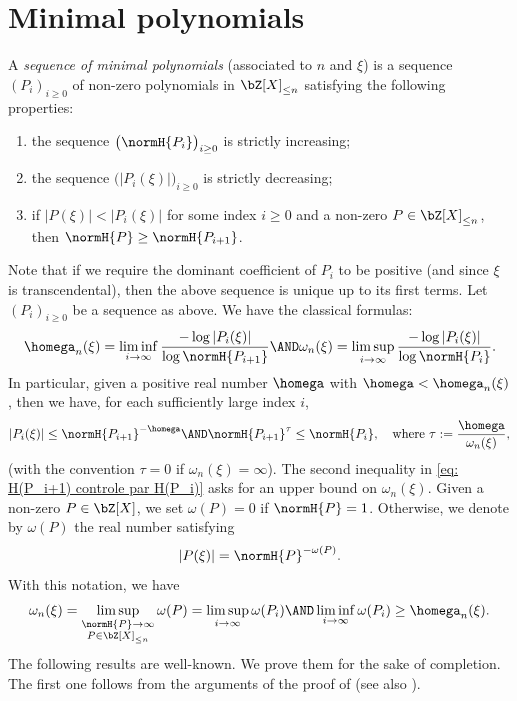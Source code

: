 \section{Minimal polynomials}
\label{section: minimal pol}

A \emph{sequence of minimal polynomials} (associated to $n$ and $\xi$) is a sequence $(P_i)_{i\geq 0}$ of non-zero polynomials in $\bZ[X]_{\leq n}$ satisfying the following properties:
\begin{enumerate}
\item the sequence $\big(\normH{P_i}\big)_{i\geq 0}$ is strictly increasing;
\item the sequence $\big(|P_i(\xi)|\big)_{i\geq 0}$ is strictly decreasing;
\item if $|P(\xi)| < |P_i(\xi)|$ for some index $i\geq 0$ and a non-zero $P\in\bZ[X]_{\leq n}$, then $\normH{P}\geq \normH{P_{i+1}}$.
\end{enumerate}

Note that if we require the dominant coefficient of $P_i$ to be positive (and since $\xi$ is transcendental), then the above sequence is unique up to its first terms. Let $(P_i)_{i\geq 0}$ be a sequence as above. We have the classical formulas:
\begin{equation}
\label{eq: exposant via minimal points}
\homega_n(\xi) = \liminf_{i\to \infty} \frac{-\log |P_i(\xi)|}{\log \normH{P_{i+1}}} \AND \omega_n(\xi) = \limsup_{i\to \infty} \frac{-\log |P_i(\xi)|}{\log \normH{P_{i}}}.
\end{equation}
In particular, given a positive real number $\homega$ with $\homega < \homega_n(\xi)$, then we have, for each sufficiently large index $i$,
\begin{equation}
\label{eq: H(P_i+1) controle par H(P_i)}
|P_i(\xi)| \leq \normH{P_{i+1}}^{-\homega} \AND \normH{P_{i+1}}^\tau \leq \normH{P_i},\quad \textrm{where } \tau:= \frac{\homega}{\omega_n(\xi)},
\end{equation}
(with the convention $\tau = 0$ if $\omega_n(\xi) = \infty$). The second inequality in \eqref{eq: H(P_i+1) controle par H(P_i)} asks for an upper bound on $\omega_n(\xi)$. Given a non-zero $P \in \bZ[X]$, we set $\omega(P)=0$ if $\normH{P} = 1$. Otherwise, we denote by $\omega(P)$ the real number satisfying
\[
|P(\xi)| = \normH{P}^{-\omega(P)}.
\]
With this notation, we have
\begin{equation}
\label{eq: encadrement omega(P_i)}
\omega_n(\xi) = \limsup_{\substack{\normH{P}\to \infty \\ P\in\bZ[X]_{\leq n}}} \omega(P) = \limsup_{i\to \infty} \omega(P_i) \AND \liminf_{i\to \infty} \omega(P_i) \geq \homega_n(\xi).
\end{equation}
The following results are well-known. We prove them for the sake of completion. The first one follows from the arguments of the proof of \cite[Lem.\,2]{davenport1967approximation} (see also \cite[Lem.\,4.1]{roy2004approximation}).

